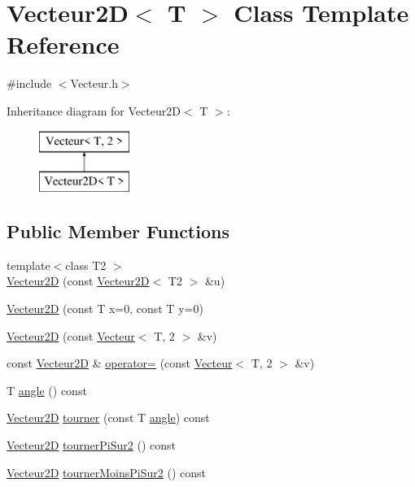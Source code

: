 \hypertarget{class_vecteur2_d}{\section{Vecteur2\-D$<$ T $>$ Class Template Reference}
\label{class_vecteur2_d}
}


{\ttfamily \#include $<$Vecteur.\-h$>$}

Inheritance diagram for Vecteur2\-D$<$ T $>$\-:\begin{figure}[H]
\begin{center}
\leavevmode
\includegraphics[height=2.000000cm]{class_vecteur2_d}
\end{center}
\end{figure}
\subsection*{Public Member Functions}
\begin{DoxyCompactItemize}
\item 
{\footnotesize template$<$class T2 $>$ }\\\hyperlink{class_vecteur2_d_aaeed114a03440778eafabd7d97613940}{Vecteur2\-D} (const \hyperlink{class_vecteur2_d}{Vecteur2\-D}$<$ T2 $>$ \&u)
\item 
\hyperlink{class_vecteur2_d_a8445fc164933218135a7367d331c9420}{Vecteur2\-D} (const T x=0, const T y=0)
\item 
\hyperlink{class_vecteur2_d_ad8fbdbe8868c6d2c2b4ba595d97d351c}{Vecteur2\-D} (const \hyperlink{class_vecteur}{Vecteur}$<$ T, 2 $>$ \&v)
\item 
const \hyperlink{class_vecteur2_d}{Vecteur2\-D} \& \hyperlink{class_vecteur2_d_a255ae104ab5cc951f60c4d8fa8f0f815}{operator=} (const \hyperlink{class_vecteur}{Vecteur}$<$ T, 2 $>$ \&v)
\item 
T \hyperlink{class_vecteur2_d_ae61a247f0e5865c44acfdebe2c2b5576}{angle} () const 
\item 
\hyperlink{class_vecteur2_d}{Vecteur2\-D} \hyperlink{class_vecteur2_d_ab08bc3a39110d9af846244981b5e4253}{tourner} (const T \hyperlink{class_vecteur2_d_ae61a247f0e5865c44acfdebe2c2b5576}{angle}) const 
\item 
\hyperlink{class_vecteur2_d}{Vecteur2\-D} \hyperlink{class_vecteur2_d_aced7fc87df9102a148d926632841aa0d}{tourner\-Pi\-Sur2} () const 
\item 
\hyperlink{class_vecteur2_d}{Vecteur2\-D} \hyperlink{class_vecteur2_d_a7c798458503ff4f7ccff9b32ccc77b77}{tourner\-Moins\-Pi\-Sur2} () const 
\end{DoxyCompactItemize}
